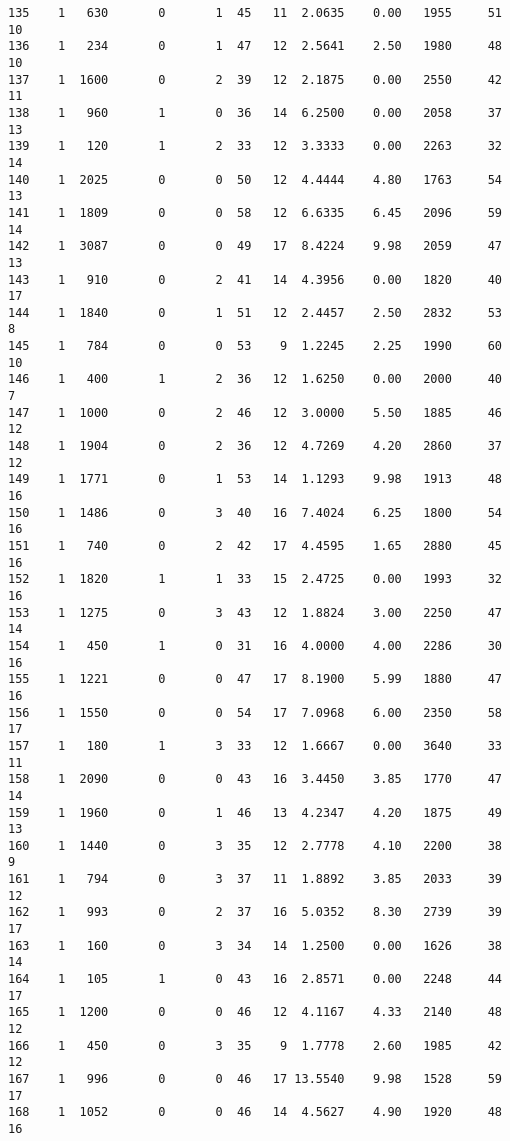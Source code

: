 \documentclass[
  letterpaper,
  DIV=11,
  numbers=noendperiod]{scrreprt}
\begin{document}
\begin{verbatim}
135    1   630       0       1  45   11  2.0635    0.00   1955     51      10
136    1   234       0       1  47   12  2.5641    2.50   1980     48      10
137    1  1600       0       2  39   12  2.1875    0.00   2550     42      11
138    1   960       1       0  36   14  6.2500    0.00   2058     37      13
139    1   120       1       2  33   12  3.3333    0.00   2263     32      14
140    1  2025       0       0  50   12  4.4444    4.80   1763     54      13
141    1  1809       0       0  58   12  6.6335    6.45   2096     59      14
142    1  3087       0       0  49   17  8.4224    9.98   2059     47      13
143    1   910       0       2  41   14  4.3956    0.00   1820     40      17
144    1  1840       0       1  51   12  2.4457    2.50   2832     53       8
145    1   784       0       0  53    9  1.2245    2.25   1990     60      10
146    1   400       1       2  36   12  1.6250    0.00   2000     40       7
147    1  1000       0       2  46   12  3.0000    5.50   1885     46      12
148    1  1904       0       2  36   12  4.7269    4.20   2860     37      12
149    1  1771       0       1  53   14  1.1293    9.98   1913     48      16
150    1  1486       0       3  40   16  7.4024    6.25   1800     54      16
151    1   740       0       2  42   17  4.4595    1.65   2880     45      16
152    1  1820       1       1  33   15  2.4725    0.00   1993     32      16
153    1  1275       0       3  43   12  1.8824    3.00   2250     47      14
154    1   450       1       0  31   16  4.0000    4.00   2286     30      16
155    1  1221       0       0  47   17  8.1900    5.99   1880     47      16
156    1  1550       0       0  54   17  7.0968    6.00   2350     58      17
157    1   180       1       3  33   12  1.6667    0.00   3640     33      11
158    1  2090       0       0  43   16  3.4450    3.85   1770     47      14
159    1  1960       0       1  46   13  4.2347    4.20   1875     49      13
160    1  1440       0       3  35   12  2.7778    4.10   2200     38       9
161    1   794       0       3  37   11  1.8892    3.85   2033     39      12
162    1   993       0       2  37   16  5.0352    8.30   2739     39      17
163    1   160       0       3  34   14  1.2500    0.00   1626     38      14
164    1   105       1       0  43   16  2.8571    0.00   2248     44      17
165    1  1200       0       0  46   12  4.1167    4.33   2140     48      12
166    1   450       0       3  35    9  1.7778    2.60   1985     42      12
167    1   996       0       0  46   17 13.5540    9.98   1528     59      17
168    1  1052       0       0  46   14  4.5627    4.90   1920     48      16

\end{verbatim}
\end{document}
